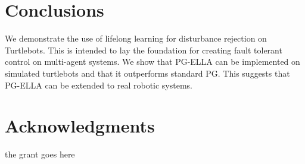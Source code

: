 \documentclass{aamas2016}
\begin{document}
\section{Conclusions}
We demonstrate the use of lifelong learning for disturbance rejection on Turtlebots. This is intended to lay the foundation for creating fault tolerant control on multi-agent systems. We show that PG-ELLA can be implemented on simulated turtlebots and that it outperforms standard PG. This suggests that PG-ELLA can be extended to real robotic systems.

\section*{Acknowledgments}
{\color{red} 
the grant goes here
}



%
\end{document}
